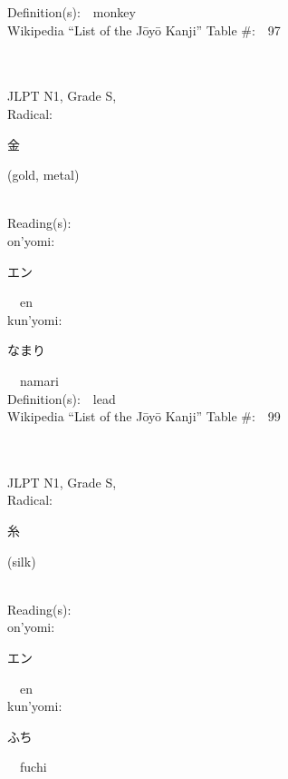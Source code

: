 \begin{multicols}{2}
Definition(s):\ \ monkey \\
Wikipedia ``List of the J\=oy\=o Kanji'' Table \#:\ \ 97 \\
\ \ \\
{\fontsize{34pt}{40pt}  }\ \ \\
{JLPT N1, Grade S, \\Radical:\ \ {\begin{CJK}{UTF8}{min} 金 \end{CJK}} (gold, metal) } \\
Reading(s):\ \ \\
{\hspace*{1em}}on'yomi:\ \ \\
{\hspace*{2em}}{\begin{CJK}{UTF8}{min} エン \end{CJK}}\ \ en\ \ \\
{\hspace*{1em}}kun'yomi:\ \ \\
{\hspace*{2em}}{\begin{CJK}{UTF8}{min} なまり \end{CJK}}\ \ namari\ \ \\
Definition(s):\ \ lead \\
Wikipedia ``List of the J\=oy\=o Kanji'' Table \#:\ \ 99 \\
\ \ \\
{\fontsize{34pt}{40pt}  }\ \ \\
{JLPT N1, Grade S, \\Radical:\ \ {\begin{CJK}{UTF8}{min} 糸 \end{CJK}} (silk) } \\
Reading(s):\ \ \\
{\hspace*{1em}}on'yomi:\ \ \\
{\hspace*{2em}}{\begin{CJK}{UTF8}{min} エン \end{CJK}}\ \ en\ \ \\
{\hspace*{1em}}kun'yomi:\ \ \\
{\hspace*{2em}}{\begin{CJK}{UTF8}{min} ふち \end{CJK}}\ \ fuchi\ \ \\

\end{multicols}

